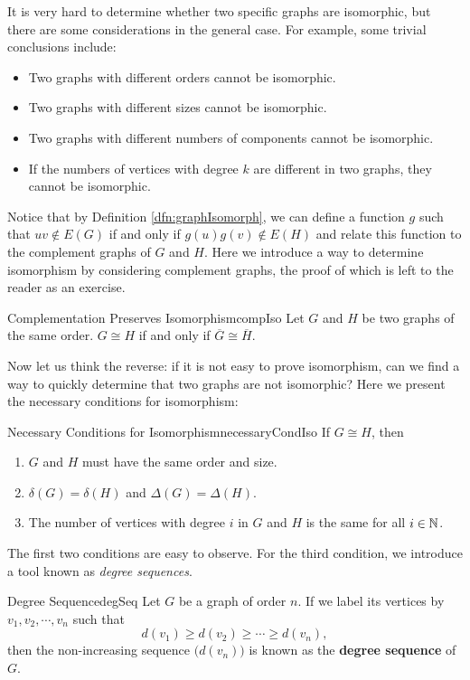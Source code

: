 \documentclass[math]{amznotes}
\theoremstyle{remark}
\begin{document}
It is very hard to determine whether two specific graphs are isomorphic, but there are some considerations in the general case. For example, some trivial conclusions include:
\begin{itemize}
    \item Two graphs with different orders cannot be isomorphic.
    \item Two graphs with different sizes cannot be isomorphic.
    \item Two graphs with different numbers of components cannot be isomorphic.
    \item If the numbers of vertices with degree $k$ are different in two graphs, they cannot be isomorphic.
\end{itemize}
Notice that by Definition \ref{dfn:graphIsomorph}, we can define a function $g$ such that $uv \notin E(G)$ if and only if $g(u)g(v) \notin E(H)$ and relate this function to the complement graphs of $G$ and $H$. Here we introduce a way to determine isomorphism by considering complement graphs, the proof of which is left to the reader as an exercise.
\begin{thmbox}{Complementation Preserves Isomorphism}{compIso}
    Let $G$ and $H$ be two graphs of the same order. $G \cong H$ if and only if $\overline{G} \cong \overline{H}$.
\end{thmbox}
Now let us think the reverse: if it is not easy to prove isomorphism, can we find a way to quickly determine that two graphs are not isomorphic? Here we present the necessary conditions for isomorphism:
\begin{thmbox}{Necessary Conditions for Isomorphism}{necessaryCondIso}
    If $G \cong H$, then
    \begin{enumerate}
        \item $G$ and $H$ must have the same order and size.
        \item $\delta(G) = \delta(H)$ and $\Delta(G) = \Delta(H)$.
        \item The number of vertices with degree $i$ in $G$ and $H$ is the same for all $i \in \mathbb{N}$.
    \end{enumerate}
\end{thmbox}
The first two conditions are easy to observe. For the third condition, we introduce a tool known as \textit{degree sequences}.
\begin{dfnbox}{Degree Sequence}{degSeq}
    Let $G$ be a graph of order $n$. If we label its vertices by $v_1, v_2, \cdots, v_n$ such that
    \begin{equation*}
        d(v_1) \geq d(v_2) \geq \cdots \geq d(v_n),
    \end{equation*}
    then the non-increasing sequence $\bigl(d(v_n)\bigr)$ is known as the {\color{red} \textbf{degree sequence}} of $G$.
\end{dfnbox}
\end{document}
